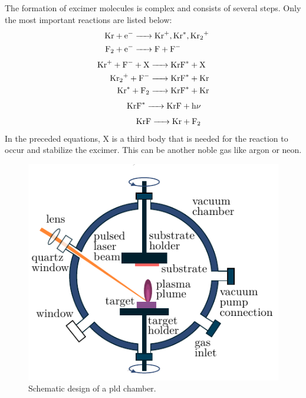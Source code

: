 The formation of excimer molecules is complex and consists of several steps.
Only the most important reactions are listed below:
\begin{align}
	\label{eq:excited_species}
	\begin{split}
		\ce{Kr + e- &-> Kr+, Kr^*, Kr_2^+} \\
		\ce{F2 + e- &-> F + F-}
	\end{split}\\
	\noalign{\vskip 0.1cm}
	\label{eq:excimer_formation}
	\begin{split}
		\ce{Kr+ + F- + X &-> KrF^* + X} \\
		\ce{Kr_2^+ + F- &-> KrF^* + Kr} \\
		\ce{Kr^* + F2 &-> KrF^* + Kr} 
	\end{split} \\
	\noalign{\vskip 0.1cm}
	\label{eq:excimer decay}
	\begin{split}
		\ce{KrF^* &-> KrF + h\nu}
	\end{split} \\
	\noalign{\vskip 0.1cm}
	\label{eq:dissociation}
	\begin{split}
		\ce{KrF &-> Kr + F_2}
	\end{split}
\end{align}
In the preceded equations, $\mathrm{X}$ is a third body that is needed for the reaction 
to occur and stabilize the excimer. 
This can be another noble gas like argon or neon.

\begin{figure}[h!]
	\centering
	\includegraphics{../assets/pld_chamber}
	\caption{Schematic design of a \ac{pld} chamber. }
	\label{fig:pld_chamber}
\end{figure}

